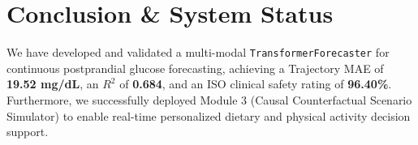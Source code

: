 \documentclass[11pt,a4paper]{article}
\begin{document}
\section{Conclusion \& System Status}
We have developed and validated a multi-modal \texttt{TransformerForecaster} for continuous postprandial glucose forecasting, achieving a Trajectory MAE of \textbf{19.52 mg/dL}, an $R^2$ of \textbf{0.684}, and an ISO clinical safety rating of \textbf{96.40\%}. Furthermore, we successfully deployed Module 3 (Causal Counterfactual Scenario Simulator) to enable real-time personalized dietary and physical activity decision support.
\end{document}
